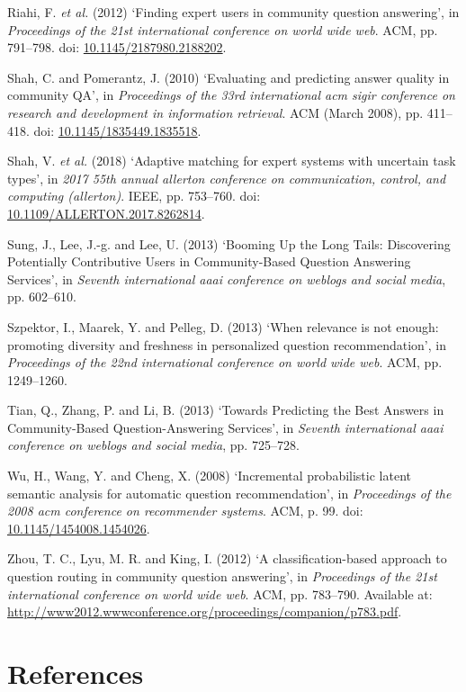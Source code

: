\documentclass[11pt,preprint, authoryear]{article}
\numberwithin{equation}{section}
\numberwithin{figure}{section}
\numberwithin{table}{section}
\begin{document}
\hypertarget{ref-Riahi2012}{}
Riahi, F. \emph{et al.} (2012) `Finding expert users in community
question answering', in \emph{Proceedings of the 21st international
conference on world wide web}. ACM, pp. 791--798. doi:
\href{https://doi.org/10.1145/2187980.2188202}{10.1145/2187980.2188202}.

\hypertarget{ref-Shah2010}{}
Shah, C. and Pomerantz, J. (2010) `Evaluating and predicting answer
quality in community QA', in \emph{Proceedings of the 33rd international
acm sigir conference on research and development in information
retrieval}. ACM (March 2008), pp. 411--418. doi:
\href{https://doi.org/10.1145/1835449.1835518}{10.1145/1835449.1835518}.

\hypertarget{ref-Shah2018}{}
Shah, V. \emph{et al.} (2018) `Adaptive matching for expert systems with
uncertain task types', in \emph{2017 55th annual allerton conference on
communication, control, and computing (allerton)}. IEEE, pp. 753--760.
doi:
\href{https://doi.org/10.1109/ALLERTON.2017.8262814}{10.1109/ALLERTON.2017.8262814}.

\hypertarget{ref-Sung2013}{}
Sung, J., Lee, J.-g. and Lee, U. (2013) `Booming Up the Long Tails:
Discovering Potentially Contributive Users in Community-Based Question
Answering Services', in \emph{Seventh international aaai conference on
weblogs and social media}, pp. 602--610.

\hypertarget{ref-Szpektor2013}{}
Szpektor, I., Maarek, Y. and Pelleg, D. (2013) `When relevance is not
enough: promoting diversity and freshness in personalized question
recommendation', in \emph{Proceedings of the 22nd international
conference on world wide web}. ACM, pp. 1249--1260.

\hypertarget{ref-Tian2013}{}
Tian, Q., Zhang, P. and Li, B. (2013) `Towards Predicting the Best
Answers in Community-Based Question-Answering Services', in
\emph{Seventh international aaai conference on weblogs and social
media}, pp. 725--728.

\hypertarget{ref-Wu2008}{}
Wu, H., Wang, Y. and Cheng, X. (2008) `Incremental probabilistic latent
semantic analysis for automatic question recommendation', in
\emph{Proceedings of the 2008 acm conference on recommender systems}.
ACM, p. 99. doi:
\href{https://doi.org/10.1145/1454008.1454026}{10.1145/1454008.1454026}.

\hypertarget{ref-Zhou2012}{}
Zhou, T. C., Lyu, M. R. and King, I. (2012) `A classification-based
approach to question routing in community question answering', in
\emph{Proceedings of the 21st international conference on world wide
web}. ACM, pp. 783--790. Available at:
\url{http://www2012.wwwconference.org/proceedings/companion/p783.pdf}.

\newcommand\wordcount{
    \immediate\write18{texcount -sub=section \jobname.tex  | grep "Section" |     sed -e 's/+.*//' | sed -n \thesection p > 'count.txt'}
(words)}

\section*{References}
\end{document}
